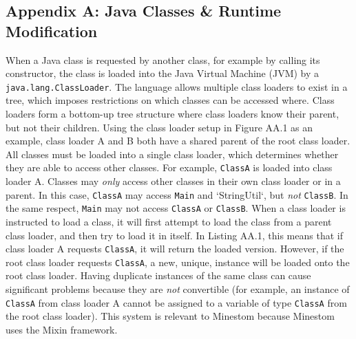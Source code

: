 \documentclass{article}
\def\code#1{\texttt{#1}}
\begin{document}
\begin{onehalfspacing}


\section{Appendix A: Java Classes \& Runtime Modification}

When a Java class is requested by another class, for example by calling
its constructor, the class is loaded into the Java Virtual Machine (JVM)
by a \code{java.lang.ClassLoader}. The language allows multiple class loaders
to exist in a tree, which imposes restrictions on which classes can be
accessed where. Class loaders form a bottom-up tree structure where
class loaders know their parent, but not their children. Using the class
loader setup in Figure AA.1 as an example, class loader A and B both
have a shared parent of the root class loader. All classes must be
loaded into a single class loader, which determines whether they are
able to access other classes. For example, \code{ClassA} is loaded into class
loader A. Classes may \emph{only} access other classes in their own class
loader or in a parent. In this case, \code{ClassA} may access \code{Main} and
`StringUtil`, but \emph{not} \code{ClassB}. In the same respect, \code{Main} may 
not access \code{ClassA} or \code{ClassB}. When a class loader is instructed to 
load a class, it will first attempt to load the class from a parent class
loader, and then try to load it in itself. In Listing AA.1, this means
that if class loader A requests \code{ClassA}, it will return the loaded
version. However, if the root class loader requests \code{ClassA}, a new,
unique, instance will be loaded onto the root class loader. Having
duplicate instances of the same class can cause significant problems
because they are \emph{not} convertible (for example, an instance of
\code{ClassA} from class loader A cannot be assigned to a variable of type
\code{ClassA} from the root class loader). This system is relevant to
Minestom because Minestom uses the Mixin framework.


\end{onehalfspacing}
\end{document}
